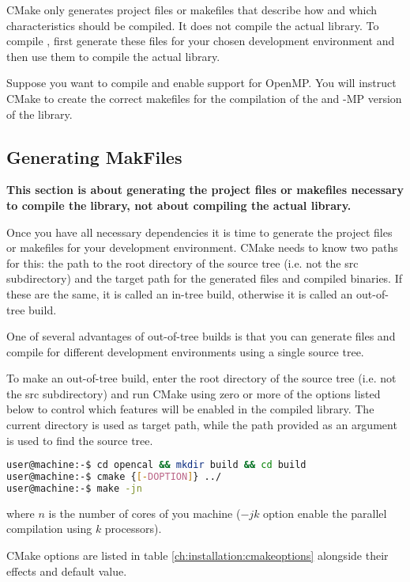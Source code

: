 CMake only generates project files or makefiles that describe how and which characteristics should be compiled. It does not compile the actual \ocal library. To compile \ocal, first generate these files for your chosen development environment and then use them to compile the actual \ocal library.

Suppose you want to compile \ocal and enable support for OpenMP. You will instruct CMake to create the correct makefiles for the compilation of the \ocal and \ocal-MP version of the library.

\subsection{Generating MakFiles}
\textbf{This section is about generating the project files or makefiles necessary to compile the}  \texttt{\ocal} \textbf{library, not about compiling the actual library.}

Once you have all necessary dependencies it is time to generate the project files or makefiles for your development environment. CMake needs to know two paths for this: the path to the root directory of the \ocal source tree (i.e. not the src subdirectory) and the target path for the generated files and compiled binaries. If these are the same, it is called an in-tree build, otherwise it is called an out-of-tree build.

One of several advantages of out-of-tree builds is that you can generate files and compile for different development environments using a single source tree.

To make an out-of-tree build, enter the root directory of the \texttt{\ocal} source tree (i.e. not the src subdirectory) and run CMake using zero or more of the options listed below to control which features will be enabled in the compiled library. The current directory is used as target path, while the path provided as an argument is used to find the source tree.


 \begin{lstlisting}[language=bash,caption={OpenCAL simple build},label={ch:quickstart:simplebuild}]
user@machine:-$ cd opencal && mkdir build && cd build
user@machine:-$ cmake {[-DOPTION]} ../
user@machine:-$ make -jn
\end{lstlisting}
where $n$ is the number of cores of you machine ($-jk$ option enable the parallel compilation using $k$ processors).

CMake options are listed in table \ref{ch:installation:cmakeoptions} alongside their effects and default value.

